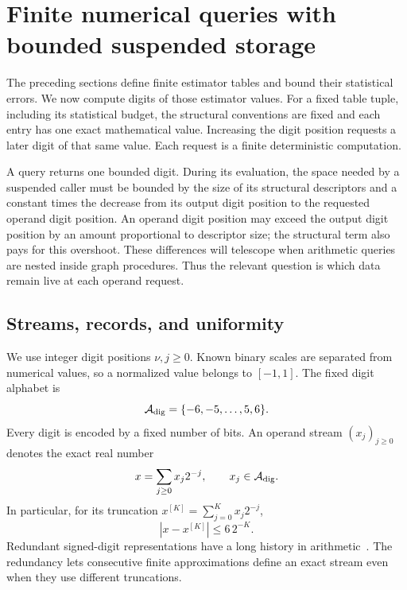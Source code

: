 \section{Finite numerical queries with bounded suspended storage}
\label{sec:arith}

The preceding sections define finite estimator tables and bound their
statistical errors.  We now compute digits of those estimator values.
For a fixed table tuple, including its statistical budget, the structural
conventions are fixed and each entry has one exact mathematical value.
Increasing the digit position requests a later digit of that same value.
Each request is a finite deterministic computation.

A query returns one bounded digit.  During its evaluation, the space
needed by a suspended caller must be bounded by the size of its
structural descriptors and a constant times the decrease from its
output digit position to the requested operand digit position.  An operand digit position may
exceed the output digit position by an amount proportional to descriptor size;
the structural term also pays for this overshoot.  These differences
will telescope when arithmetic queries are nested inside graph procedures.
Thus the relevant question is which data remain live at each operand request.

\subsection{Streams, records, and uniformity}

We use integer digit positions $\nu,j\geq 0$.  Known binary scales are separated
from numerical values, so a normalized value belongs to $[-1,1]$.
The fixed digit alphabet is
\[
 \mathcal A_{\rm dig}=\{-6,-5,\ldots,5,6\}.
\]
Every digit is encoded by a fixed number of bits.  An operand stream
$(x_j)_{j\geq0}$ denotes the exact real number
\begin{equation}
 x=\sum_{j\geq0}x_j2^{-j},\qquad x_j\in\mathcal A_{\rm dig}.
 \label{eq:arith-stream}
\end{equation}
In particular, for its truncation $x^{[K]}=\sum_{j=0}^Kx_j2^{-j}$,
\begin{equation}
 |x-x^{[K]}|\leq 6\,2^{-K}.
 \label{eq:arith-tail}
\end{equation}
Redundant signed-digit representations have a long history in
arithmetic~\cite{Avizienis1963}.  The redundancy lets consecutive
finite approximations define an exact stream even when they use
different truncations.

